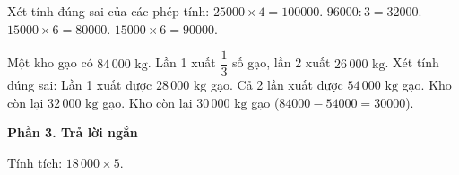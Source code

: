 \begin{ex} %
Xét tính đúng sai của các phép tính:
\choiceTF
{\True $25000 \times 4 = 100000$.}
{\True $96000 : 3 = 32000$.}
{$15000 \times 6 = 80000$.}
{\True $15000 \times 6 = 90000$.}
\end{ex}

\begin{ex} %
Một kho gạo có $84\,000\text{ kg}$. Lần 1 xuất $\dfrac{1}{3}$ số gạo, lần 2 xuất $26\,000\text{ kg}$. Xét tính đúng sai:
\choiceTF
{\True Lần 1 xuất được $28\,000\text{ kg}$ gạo.}
{\True Cả 2 lần xuất được $54\,000\text{ kg}$ gạo.}
{Kho còn lại $32\,000\text{ kg}$ gạo.}
{\True Kho còn lại $30\,000\text{ kg}$ gạo ($84000 - 54000 = 30000$).}
\end{ex}

\textbf{Phần 3. Trả lời ngắn}

\begin{ex} %
Tính tích: $18\,000 \times 5$.
\end{ex}

